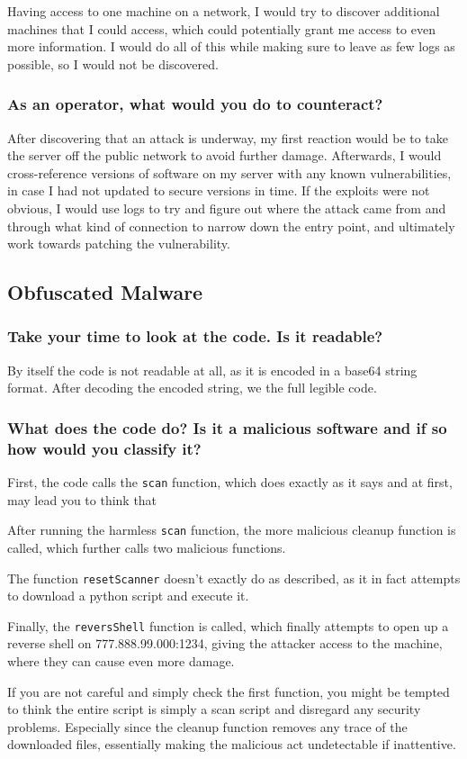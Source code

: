 Having access to one machine on a network, I would try to discover additional machines that I could access, which could potentially grant me access to even more information. I would do all of this while making sure to leave as few logs as possible, so I would not be discovered.

\subsubsection{As an operator, what would you do to counteract?}
After discovering that an attack is underway, my first reaction would be to take the server off the public network to avoid further damage. Afterwards, I would cross-reference versions of software on my server with any known vulnerabilities, in case I had not updated to secure versions in time. If the exploits were not obvious, I would use logs to try and figure out where the attack came from and through what kind of connection to narrow down the entry point, and ultimately work towards patching the vulnerability.

\subsection{Obfuscated Malware}
\subsubsection{Take your time to look at the code. Is it readable?}
By itself the code is not readable at all, as it is encoded in a base64 string format. After decoding the encoded string, we the full legible code.

\subsubsection{What does the code do? Is it a malicious software and if so how would you classify it?}
First, the code calls the \texttt{scan} function, which does exactly as it says and at first, may lead you to think that \vfill

After running the harmless \texttt{scan} function, the more malicious cleanup function is called, which further calls two malicious functions.

The function \texttt{resetScanner} doesn't exactly do as described, as it in fact attempts to download a python script and execute it.

Finally, the \texttt{reversShell} function is called, which finally attempts to open up a reverse shell on 777.888.99.000:1234, giving the attacker access to the machine, where they can cause even more damage.
\vfill



If you are not careful and simply check the first function, you might be tempted to think the entire script is simply a scan script and disregard any security problems. Especially since the cleanup function removes any trace of the downloaded files, essentially making the malicious act undetectable if inattentive.
